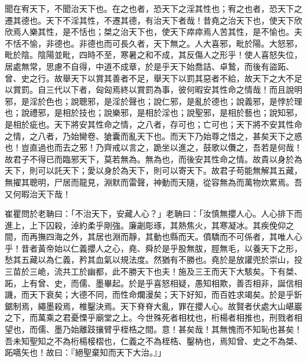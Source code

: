 
\begin{pinyinscope}
聞在宥天下，不聞治天下也。在之也者，恐天下之淫其性也；宥之也者，恐天下之遷其德也。天下不淫其性，不遷其德，有治天下者哉！昔堯之治天下也，使天下欣欣焉人樂其性，是不恬也；桀之治天下也，使天下瘁瘁焉人苦其性，是不愉也。夫不恬不愉，非德也。非德也而可長久者，天下無之。人大喜邪，毗於陽。大怒邪，毗於陰。陰陽並毗，四時不至，寒暑之和不成，其反傷人之形乎！使人喜怒失位，居處無常，思慮不自得，中道不成章，於是乎天下始喬詰、卓鷙，而後有盜跖、曾、史之行。故舉天下以賞其善者不足，舉天下以罰其惡者不給，故天下之大不足以賞罰。自三代以下者，匈匈焉終以賞罰為事，彼何暇安其性命之情哉！而且說明邪，是淫於色也；說聰邪，是淫於聲也；說仁邪，是亂於德也；說義邪，是悖於理也；說禮邪，是相於技也；說樂邪，是相於淫也；說聖邪，是相於藝也；說知邪，是相於疵也。天下將安其性命之情，之八者，存可也；亡可也；天下將不安其性命之情，之八者，乃始臠卷、獊囊而亂天下也。而天下乃始尊之惜之，甚矣天下之惑也！豈直過也而去之邪！乃齊戒以言之，跪坐以進之，鼓歌以儛之，吾若是何哉！故君子不得已而臨邪天下，莫若無為。無為也，而後安其性命之情。故貴以身於為天下，則可以託天下；愛以身於為天下，則可以寄天下。故君子苟能無解其五藏，無擢其聰明，尸居而龍見，淵默而雷聲，神動而天隨，從容無為而萬物炊累焉。吾又何暇治天下哉！

崔瞿問於老聃曰：「不治天下，安藏人心？」老聃曰：「汝慎無攖人心。人心排下而進上，上下囚殺，淖約柔乎剛強。廉劌彫琢，其熱焦火，其寒凝冰。其疾俛仰之間，而再撫四海之外，其居也淵而靜，其動也縣而天。僨驕而不可係者，其唯人心乎！昔者黃帝始以仁義攖人之心，堯、舜於是乎股無胈，脛無毛，以養天下之形，愁其五藏以為仁義，矜其血氣以規法度。然猶有不勝也。堯於是放讙兜於崇山，投三苗於三峗，流共工於幽都，此不勝天下也夫！施及三王而天下大駭矣。下有桀、跖，上有曾、史，而儒、墨畢起。於是乎喜怒相疑，愚知相欺，善否相非，誕信相譏，而天下衰矣；大德不同，而性命爛漫矣；天下好知，而百姓求竭矣。於是乎釿鋸制焉，繩墨殺焉，椎鑿決焉。天下脊脊大亂，罪在攖人心。故賢者伏處大山嵁巖之下，而萬乘之君憂慄乎廟堂之上。今世殊死者相枕也，桁楊者相推也，刑戮者相望也，而儒、墨乃始離跂攘臂乎桎梏之間。意！甚矣哉！其無愧而不知恥也甚矣！吾未知聖知之不為桁楊椄槢也，仁義之不為桎梏、鑿枘也，焉知曾、史之不為桀、跖嚆矢也！故曰：『絕聖棄知而天下大治。』」


\end{pinyinscope}
